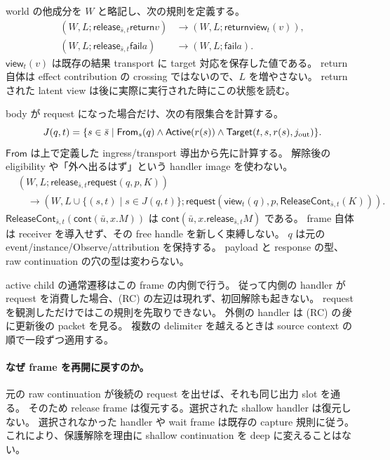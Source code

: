 \documentclass[11pt,a4paper]{article}
\newcommand{\Ret}{\mathsf{return}}
\newcommand{\Req}{\mathsf{request}}
\newcommand{\Fail}{\mathsf{fail}}
\begin{document}
world の他成分を \(W\) と略記し、次の規則を定義する。
\[
\begin{split}
 (W,L;\mathsf{release}_{\bar s,t}\Ret v)
   &\longrightarrow(W,L;\Ret\mathsf{view}_t(v)),\\
 (W,L;\mathsf{release}_{\bar s,t}\Fail a)
   &\longrightarrow(W,L;\Fail a).
\end{split}
\]
\(\mathsf{view}_t(v)\) は既存の結果 transport に target 対応を保存した値である。
return 自体は effect contribution の crossing ではないので、\(L\) を増やさない。
return された latent view は後に実際に実行された時にこの状態を読む。

body が request になった場合だけ、次の有限集合を計算する。
\[
 J(q,t)=\{s\in\bar s\mid
       \mathsf{From}_s(q)\land\mathsf{Active}(r(s))
       \land\mathsf{Target}(t,s,r(s),j_{\rm out})\}.
\]
\(\mathsf{From}\) は上で定義した ingress/transport 導出から先に計算する。
解除後の eligibility や「外へ出るはず」という handler image を使わない。
\[
\begin{split}
 &(W,L;\mathsf{release}_{\bar s,t}\Req(q,p,K))\\
 &\quad\longrightarrow
 (W,L\cup\{(s,t)\mid s\in J(q,t)\};
       \Req(\mathsf{view}_t(q),p,\mathsf{ReleaseCont}_{\bar s,t}(K))).
\end{split}
\tag{RC}
\]
\(\mathsf{ReleaseCont}_{\bar s,t}(\mathsf{cont}(\bar u,x.M))\) は
\(\mathsf{cont}(\bar u,x.\mathsf{release}_{\bar s,t}M)\) である。
frame 自体は receiver を導入せず、その free handle を新しく束縛しない。
\(q\) は元の event/instance/Observe/attribution を保持する。
payload と response の型、raw continuation の穴の型は変わらない。

active child の通常遷移はこの frame の内側で行う。
従って内側の handler が request を消費した場合、(RC) の左辺は現れず、初回解除も起きない。
request を観測しただけではこの規則を先取りできない。
外側の handler は (RC) の\emph{後}に更新後の packet を見る。
複数の delimiter を越えるときは source context の順で一段ずつ適用する。

\paragraph{なぜ frame を再開に戻すのか。}
元の raw continuation が後続の request を出せば、それも同じ出力 slot を通る。
そのため release frame は復元する。選択された shallow handler は復元しない。
選択されなかった handler や wait frame は既存の capture 規則に従う。
これにより、保護解除を理由に shallow continuation を deep に変えることはない。
\end{document}
